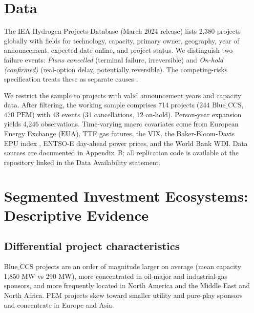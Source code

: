\documentclass[review,authoryear,11pt]{elsarticle}
\newcommand{\BlueCCS}{\mathrm{Blue\_CCS}}
\newcommand{\PEM}{\mathrm{PEM}}
\newcommand{\EUA}{\mathrm{EUA}}
\begin{document}
\section{Data}

The IEA Hydrogen Projects Database \citep{IEA2024} (March 2024 release) lists 2,380 projects globally with fields for technology, capacity, primary owner, geography, year of announcement, expected date online, and project status. We distinguish two failure events: \textit{Plans cancelled} (terminal failure, irreversible) and \textit{On-hold (confirmed)} (real-option delay, potentially reversible). The competing-risks specification treats these as separate causes \citep{FineGray1999}.

We restrict the sample to projects with valid announcement years and capacity data. After filtering, the working sample comprises 714 projects (244 $\BlueCCS$, 470 $\PEM$) with 43 events (31 cancellations, 12 on-hold). Person-year expansion \citep{Allison2014, SingerWillett2003} yields 4,246 observations. Time-varying macro covariates come from European Energy Exchange ($\EUA$), TTF gas futures, the VIX, the Baker-Bloom-Davis EPU index \citep{BakerBloomDavis2016}, ENTSO-E day-ahead power prices, and the World Bank WDI. Data sources are documented in Appendix~B; all replication code is available at the repository linked in the Data Availability statement.

\section{Segmented Investment Ecosystems: Descriptive Evidence}

\subsection{Differential project characteristics}

$\BlueCCS$ projects are an order of magnitude larger on average (mean capacity 1{,}850 MW vs 290 MW), more concentrated in oil-major and industrial-gas sponsors, and more frequently located in North America and the Middle East and North Africa. $\PEM$ projects skew toward smaller utility and pure-play sponsors and concentrate in Europe and Asia.
\end{document}
